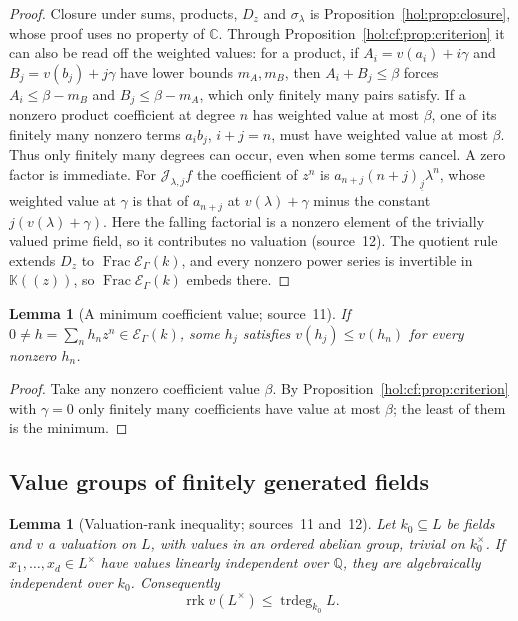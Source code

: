 \documentclass[11pt]{article}
\numberwithin{equation}{section}
\newtheorem{lemma}[theorem]{Lemma}
\theoremstyle{definition}
\theoremstyle{remark}
\newcommand{\C}{\mathbb C}
\newcommand{\Q}{\mathbb Q}
\newcommand{\fall}[2]{(#1)_{\underline{#2}}}
\newcommand{\KK}{\mathbb K}
\newcommand{\EK}{\mathcal E_\Gamma(k)}
\newcommand{\FE}{\operatorname{Frac}\EK}
\newcommand{\trdeg}{\operatorname{trdeg}}
\newcommand{\rrk}{\operatorname{rrk}}
\newcommand{\jet}[2]{\mathcal J_{#1,#2}}
\begin{document}
\begin{proof}
Closure under sums, products, $D_z$ and $\sigma_\lambda$ is
Proposition~\ref{hol:prop:closure}, whose proof uses no property of $\C$.
Through Proposition~\ref{hol:cf:prop:criterion} it can also be read off the
weighted values: for a product, if $A_i=v(a_i)+i\gamma$ and
$B_j=v(b_j)+j\gamma$ have lower bounds $m_A,m_B$, then $A_i+B_j\le\beta$
forces $A_i\le\beta-m_B$ and $B_j\le\beta-m_A$, which only finitely many pairs
satisfy. If a nonzero product coefficient at degree $n$ has weighted value
at most $\beta$, one of its finitely many nonzero terms $a_i b_j$, $i+j=n$,
must have weighted value at most $\beta$. Thus only finitely many degrees
can occur, even when some terms cancel. A zero factor is immediate.
For $\jet\lambda jf$ the coefficient of $z^n$ is
$a_{n+j}\fall{n+j}j\lambda^n$, whose weighted value at $\gamma$ is that of
$a_{n+j}$ at $v(\lambda)+\gamma$ minus the constant $j(v(\lambda)+\gamma)$.
Here the falling factorial is a nonzero element of the trivially valued
prime field, so it contributes no valuation (source~12). The quotient rule
extends $D_z$ to $\FE$, and every nonzero
power series is invertible in $\KK((z))$, so $\FE$ embeds there.
\end{proof}

\begin{lemma}[A minimum coefficient value; source~11]\label{hol:cf:lem:min}
If $0\ne h=\sum_nh_nz^n\in\EK$, some $h_j$ satisfies $v(h_j)\le v(h_n)$ for
every nonzero $h_n$.
\end{lemma}

\begin{proof}
Take any nonzero coefficient value $\beta$. By
Proposition~\ref{hol:cf:prop:criterion} with $\gamma=0$ only finitely many
coefficients have value at most $\beta$; the least of them is the minimum.
\end{proof}

\subsection{Value groups of finitely generated fields}
\label{hol:cf:sub:valuation}

\begin{lemma}[Valuation-rank inequality; sources~11 and~12]
\label{hol:cf:lem:valuerank}
Let $k_0\subseteq L$ be fields and $v$ a valuation on $L$, with values in an
ordered abelian group, trivial on $k_0^\times$. If $x_1,\ldots,x_d\in L^\times$
have values linearly independent over $\Q$, they are algebraically independent
over $k_0$. Consequently
\begin{equation}\label{hol:cf:eq:valuerank}
 \rrk v(L^\times)\le\trdeg_{k_0}L.
\end{equation}
\end{lemma}
\end{document}
